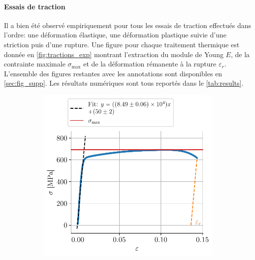 \paragraph{Essais de traction}
Il a bien été observé empiriquement pour tous les essais de traction effectués dans l'ordre: une déformation élastique, une déformation plastique suivie d'une striction puis d'une rupture. Une figure pour chaque traitement thermique est donnée en \autoref{fig:tractions_exp} montrant l'extraction du module de Young $E$, de la contrainte maximale $\sigma_\mathrm{max}$ et de la déformation rémanente à la rupture $\varepsilon_r$. L'ensemble des figures restantes avec les annotations sont disponibles en \autoref{sec:fig_supp}. Les résultats numériques sont tous reportés dans le \autoref{tab:results}.
\begin{figure}[H]
    \centering
    \begin{subfigure}{0.48\linewidth}
        \centering
        \includegraphics[width=\linewidth]{figures/froid2_annotated.pdf}
        \caption{}
        \label{fig:froid1}
    \end{subfigure}
    \begin{subfigure}{0.48\linewidth}
        \centering

\end{subfigure}
\end{figure}
